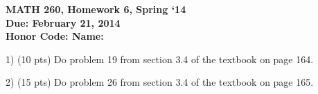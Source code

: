 \documentclass{article}
\begin{document}
\begin{flushleft}
	\bfseries{MATH 260, Homework 6, Spring `14}\\
	\bfseries{Due: February 21, 2014}\\
	\bfseries{Honor Code:} \hspace{3.5in}\bfseries{Name:}\\
\end{flushleft}
\begin{flushleft}
\vspace{.25in}

1) (10 pts) Do problem 19 from section 3.4 of the textbook on page 164.

\vspace{2in}

2) (15 pts) Do problem 26 from section 3.4 of the textbook on page 165.


\end{flushleft}
\end{document}
